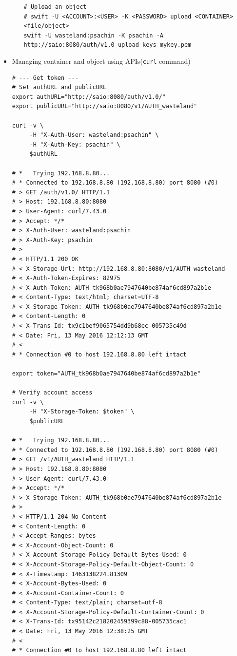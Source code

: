 \documentclass{article}
\begin{document}
\begin{itemize}
\begin{itemize}
\begin{verbatim}
# Upload an object
# swift -U <ACCOUNT>:<USER> -K <PASSWORD> upload <CONTAINER> <file/object>
swift -U wasteland:psachin -K psachin -A http://saio:8080/auth/v1.0 upload keys mykey.pem
\end{verbatim}
\end{itemize}
\item Managing container and object using APIs(\texttt{curl} command)
\begin{verbatim}
# --- Get token ---
# Set authURL and publicURL
export authURL="http://saio:8080/auth/v1.0/"
export publicURL="http://saio:8080/v1/AUTH_wasteland"

curl -v \
     -H "X-Auth-User: wasteland:psachin" \
     -H "X-Auth-Key: psachin" \
     $authURL

# *   Trying 192.168.8.80...
# * Connected to 192.168.8.80 (192.168.8.80) port 8080 (#0)
# > GET /auth/v1.0/ HTTP/1.1
# > Host: 192.168.8.80:8080
# > User-Agent: curl/7.43.0
# > Accept: */*
# > X-Auth-User: wasteland:psachin
# > X-Auth-Key: psachin
# >
# < HTTP/1.1 200 OK
# < X-Storage-Url: http://192.168.8.80:8080/v1/AUTH_wasteland
# < X-Auth-Token-Expires: 82975
# < X-Auth-Token: AUTH_tk968b0ae7947640be874af6cd897a2b1e
# < Content-Type: text/html; charset=UTF-8
# < X-Storage-Token: AUTH_tk968b0ae7947640be874af6cd897a2b1e
# < Content-Length: 0
# < X-Trans-Id: tx9c1bef9065754dd9b68ec-005735c49d
# < Date: Fri, 13 May 2016 12:12:13 GMT
# <
# * Connection #0 to host 192.168.8.80 left intact

export token="AUTH_tk968b0ae7947640be874af6cd897a2b1e"

# Verify account access
curl -v \
     -H "X-Storage-Token: $token" \
     $publicURL

# *   Trying 192.168.8.80...
# * Connected to 192.168.8.80 (192.168.8.80) port 8080 (#0)
# > GET /v1/AUTH_wasteland HTTP/1.1
# > Host: 192.168.8.80:8080
# > User-Agent: curl/7.43.0
# > Accept: */*
# > X-Storage-Token: AUTH_tk968b0ae7947640be874af6cd897a2b1e
# >
# < HTTP/1.1 204 No Content
# < Content-Length: 0
# < Accept-Ranges: bytes
# < X-Account-Object-Count: 0
# < X-Account-Storage-Policy-Default-Bytes-Used: 0
# < X-Account-Storage-Policy-Default-Object-Count: 0
# < X-Timestamp: 1463138224.81309
# < X-Account-Bytes-Used: 0
# < X-Account-Container-Count: 0
# < Content-Type: text/plain; charset=utf-8
# < X-Account-Storage-Policy-Default-Container-Count: 0
# < X-Trans-Id: tx95142c218202459399c88-005735cac1
# < Date: Fri, 13 May 2016 12:38:25 GMT
# <
# * Connection #0 to host 192.168.8.80 left intact


\end{verbatim}
\end{itemize}
\end{document}
